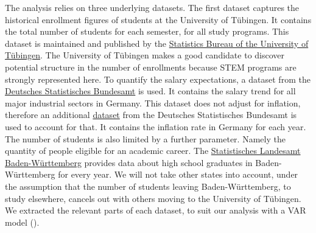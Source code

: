 \documentclass{article}
\theoremstyle{plain}
\theoremstyle{definition}
\theoremstyle{remark}
\begin{document}
The analysis relies on three underlying datasets.
The first dataset captures the historical enrollment figures of students at the University of Tübingen. 
It contains the total number of students for each semester, for all study programs. This dataset is maintained and published by the
\href{https://uni-tuebingen.de/einrichtungen/verwaltung/iv-studierende/studierendenabteilung/statistiken/}{Statistics Bureau of the University of Tübingen}.
The University of Tübingen makes a good candidate to discover potential structure in the number
of enrollments because STEM programs are strongly represented here. %
To quantify the salary expectations, a dataset from the \href{https://www-genesis.destatis.de/genesis//online?operation=table&code=62321-0001&bypass=true&levelindex=0&levelid=1702307320529#abreadcrumb}{Deutsches Statistisches Bundesamt} is used.
It contains the salary trend for all major industrial sectors in Germany. This dataset does not adjust for inflation,
therefore an additional \href{https://www-genesis.destatis.de/genesis//online?operation=table&code=61121-0001&bypass=true&levelindex=0&levelid=1706446467491#abreadcrumb}{dataset} from the Deutsches Statistisches Bundesamt is used to account for that. It contains the inflation rate in Germany for each year.
The number of students is also limited by a further parameter. Namely the quantity of people eligible for an academic career.
The \href{https://www.statistik-bw.de/BildungKultur/SchulenAllgem/LRt0302.jsp}{Statistisches Landesamt Baden-Württemberg} provides
data about high school graduates in Baden-Württemberg for every year. We will not take other states into account, under
the assumption that the number of students leaving Baden-Württemberg, to study elsewhere, cancels out with others moving to the University of Tübingen.
We extracted the relevant parts of each dataset, to suit our analysis with a VAR model ().


\end{document}
